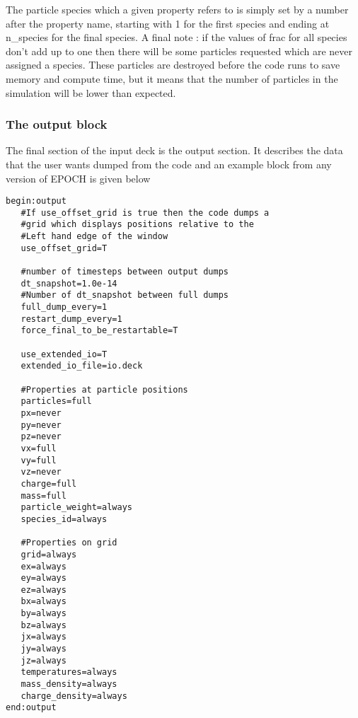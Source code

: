 \documentclass[12pt]{article}
\newcommand{\simpleboxverbatim}{\begin{Verbatim}[obeytabs=true,frame=single,
  framerule=0.5mm,rulecolor=\color{warwickmid}]}
\newcommand{\EPOCH}{{\color{warwickdark}\fontfamily{phv}\selectfont EPOCH} }
\begin{document}
The particle species which a given property refers to is simply set by a
number after the property name, starting with 1 for the first species and
ending at n\_species for the final species. A final note : if the values of
frac for all species don't add up to one then there will be some particles
requested which are never assigned a species. These particles are destroyed
before the code runs to save memory and compute time, but it means that the
number of particles in the simulation will be lower than expected.\\

\subsubsection{The output block}
The final section of the input deck is the output section. It describes the
data that the user wants dumped from the code and an example block from any
version of \EPOCH is given below\\
\simpleboxverbatim
begin:output
   #If use_offset_grid is true then the code dumps a
   #grid which displays positions relative to the
   #Left hand edge of the window
   use_offset_grid=T

   #number of timesteps between output dumps
   dt_snapshot=1.0e-14
   #Number of dt_snapshot between full dumps
   full_dump_every=1
   restart_dump_every=1
   force_final_to_be_restartable=T

   use_extended_io=T
   extended_io_file=io.deck

   #Properties at particle positions
   particles=full
   px=never
   py=never
   pz=never
   vx=full
   vy=full
   vz=never
   charge=full
   mass=full
   particle_weight=always
   species_id=always

   #Properties on grid
   grid=always
   ex=always
   ey=always
   ez=always
   bx=always
   by=always
   bz=always
   jx=always
   jy=always
   jz=always
   temperatures=always
   mass_density=always
   charge_density=always
end:output
\end{Verbatim}
\end{document}

